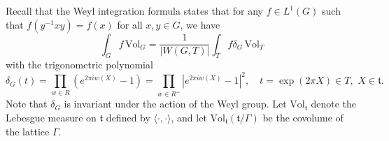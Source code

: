 \documentclass[11pt,a4paper]{article}
\theoremstyle{definition}
\begin{document}
Recall that the Weyl integration formula \cite[p.\ 338]{BOU} states that for any $f \in L^1 (G)$ such that $f(y^{-1}xy) = f(x)$ for all $x,y \in G$, we have
\begin{equation}\label{weylintegration}
\int_G f \, \mathrm{Vol}_G = \frac{1}{|W(G,T)|} \int_T f \delta_G \, \mathrm{Vol}_T
\end{equation}
with the trigonometric polynomial
\[ \delta_G (t) = \prod_{w \in R} (e^{2 \pi i w(X)}-1) = \prod_{w \in R^+} |e^{2 \pi i w(X)}-1|^2 , \quad t=\exp (2 \pi X) \in T, \,\, X \in \mathfrak{t}. \]
Note that $\delta_G$ is invariant under the action of the Weyl group. Let $\mathrm{Vol}_{\mathfrak{t}}$ denote the Lebesgue measure on $\mathfrak{t}$ defined by $\langle \cdot, \cdot \rangle$, and let $\mathrm{Vol}_{\mathfrak{t}}(\mathfrak{t}/\Gamma)$ be the covolume of the lattice $\Gamma$.
\end{document}
